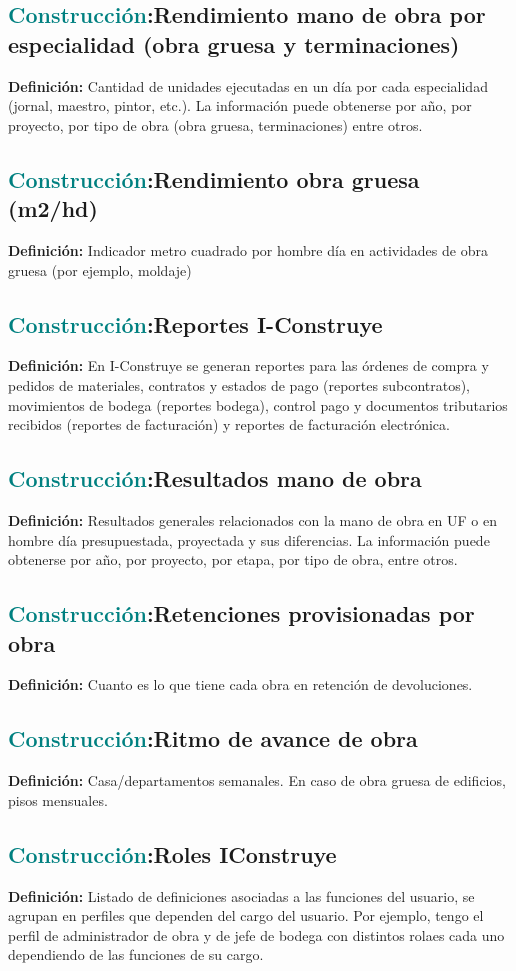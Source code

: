 \documentclass[12pt]{article}
\begin{document}
\subsection{\textcolor{teal}{Construcción}:{Rendimiento mano de obra por especialidad (obra gruesa y terminaciones)}}
\textbf{Definición:} Cantidad de unidades ejecutadas en un día por cada especialidad (jornal, maestro, pintor, etc.). La información puede obtenerse por año, por proyecto, por tipo de obra (obra gruesa, terminaciones) entre otros.
\subsection{\textcolor{teal}{Construcción}:{Rendimiento obra gruesa (m2/hd)}}
\textbf{Definición:} Indicador metro cuadrado por hombre día en actividades de obra gruesa (por ejemplo, moldaje)
\subsection{\textcolor{teal}{Construcción}:{Reportes I-Construye}}
\textbf{Definición:} En I-Construye se generan reportes para las órdenes de compra y pedidos de materiales, contratos y estados de pago (reportes subcontratos), movimientos de bodega (reportes bodega), control pago y documentos tributarios recibidos (reportes de facturación) y reportes de facturación electrónica.
\subsection{\textcolor{teal}{Construcción}:{Resultados mano de obra}}
\textbf{Definición:} Resultados generales relacionados con la mano de obra en UF o en hombre día presupuestada, proyectada y sus diferencias. La información puede obtenerse por año, por proyecto, por etapa, por tipo de obra, entre otros.
\subsection{\textcolor{teal}{Construcción}:{Retenciones provisionadas por obra}}
\textbf{Definición:} Cuanto es lo que tiene cada obra en retención de devoluciones.
\subsection{\textcolor{teal}{Construcción}:{Ritmo de avance de obra}}
\textbf{Definición:} Casa/departamentos semanales. En caso de obra gruesa de edificios, pisos mensuales.
\subsection{\textcolor{teal}{Construcción}:{Roles IConstruye}}
\textbf{Definición:} Listado de definiciones asociadas a las funciones del usuario, se agrupan en perfiles que dependen del cargo del usuario. Por ejemplo, tengo el perfil de administrador de obra y de jefe de bodega con distintos rolaes cada uno dependiendo de las funciones de su cargo.
\end{document}
